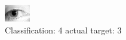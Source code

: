 \begin{figure}[h!]
\begin{center}
\includegraphics[width=0.60\columnwidth]{figures/ID1253_class_4_target_3.png}
\end{center}
\caption{ Classification: 4 actual target: 3}
\label{fig:ID1253_class_4_target_3}
\end{figure}

